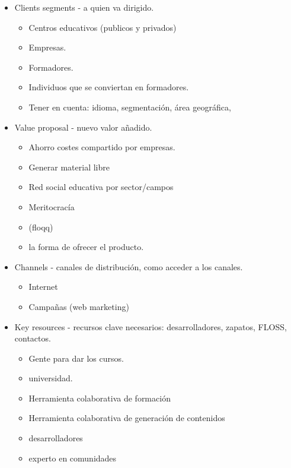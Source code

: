 \documentclass{article}
\begin{document}
\begin{itemize}
    \item Clients segments - a quien va dirigido.
    
    \begin{itemize}
        \item Centros educativos (publicos y privados)
        \item Empresas.
        \item Formadores.
        \item Individuos que se conviertan en formadores.
        \item Tener en cuenta: idioma, segmentación, área geográfica,
    \end{itemize}
    
    \item Value proposal - nuevo valor añadido.
    
    \begin{itemize}
        \item Ahorro costes compartido por empresas.
        \item Generar material libre
        \item Red social educativa por sector/campos
        \item Meritocracía
        \item (floqq)
        \item la forma de ofrecer el producto.
    \end{itemize}
    
    \item Channels - canales de distribución, como acceder a los canales.
    
    \begin{itemize}
        \item Internet
        \item Campañas (web marketing)
    \end{itemize}
    
    \item Key resources - recursos clave necesarios: desarrolladores,
    zapatos, FLOSS, contactos.
    
    \begin{itemize}
        \item Gente para dar los cursos.
        \item universidad.
        \item Herramienta colaborativa de formación
        \item Herramienta colaborativa de generación de contenidos
        \item desarrolladores
        \item experto en comunidades
    \end{itemize}
    

\end{itemize}
\end{document}
